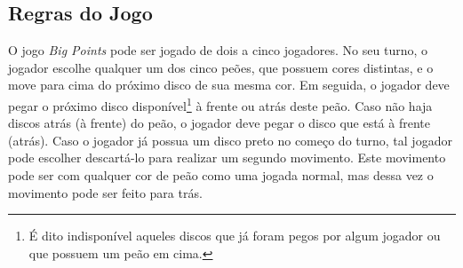 \subsection{Regras do Jogo}
\label{subsec:regras-do-jogo}
O jogo \emph{Big Points} pode ser jogado de dois a cinco jogadores. No seu turno, o jogador escolhe qualquer um dos cinco peões, que possuem cores distintas, e o move para cima do próximo disco de sua mesma cor. Em seguida, o jogador deve pegar o próximo disco disponível\footnote{É dito indisponível aqueles discos que já foram pegos por algum jogador ou que possuem um peão em cima.} à frente ou atrás deste peão. Caso não haja discos atrás (à frente) do peão, o jogador deve pegar o disco que está à frente (atrás). Caso o jogador já possua um disco preto no começo do turno, tal jogador pode escolher descartá-lo para realizar um segundo movimento. Este movimento pode ser com qualquer cor de peão como uma jogada normal, mas dessa vez o movimento pode ser feito para trás.
